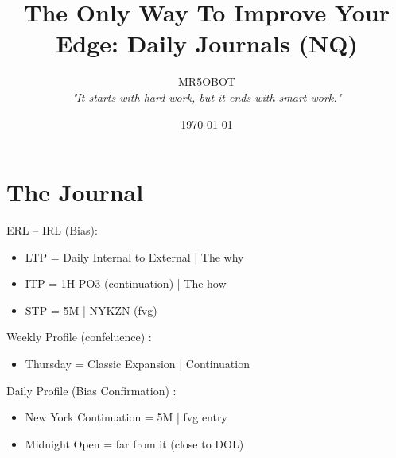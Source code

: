 \documentclass{article}
\title{The Only Way To Improve Your Edge: Daily Journals (NQ)}
\author{MR5OBOT \\ \textit{"It starts with hard work, but it ends with smart work."}}
\date{\today}
\begin{document}
\maketitle
\pagestyle{fancy}
\noindent\hdashrule[0.2ex]{\linewidth}{0.2pt}{1mm} 


\section{The Journal} 
\vspace{0.3cm}

\begin{enumerate}
\begin{notebox}
  \item ERL -- IRL (Bias): 
\end{notebox}

\begin{itemize} 
  \item LTP = \hspace{0.3pt} Daily Internal to External | The why \vspace{0.2cm}
  \item ITP = \hspace{0.3pt} 1H PO3 (continuation) | The how \vspace{0.2cm}
  \item STP = \hspace{0.3pt} 5M | NYKZN (fvg) \vspace{0.2cm}
\end{itemize}

\begin{notebox}
    \item Weekly Profile (confeluence)  : 
\end{notebox}

\begin{itemize} 
  \item Thursday  = \hspace{0.3pt} Classic Expansion | Continuation
\end{itemize}

\begin{notebox}
    \item Daily Profile (Bias Confirmation)  : 
\end{notebox}

\begin{itemize} 
  \item New York Continuation = \hspace{0.3pt} 5M |  fvg entry
  \item Midnight Open = \hspace{0.3pt} far from it (close to DOL)

\end{itemize}
\end{enumerate}
\end{document}
